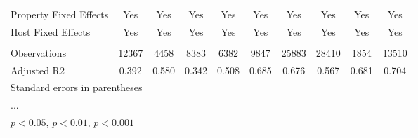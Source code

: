 \begin{table}[htbp]
\begin{tabular}{l*{9}{c}}
Property Fixed Effects&         Yes         &         Yes         &         Yes         &         Yes         &         Yes         &         Yes         &         Yes         &         Yes         &         Yes         \\
Host Fixed Effects  &         Yes         &         Yes         &         Yes         &         Yes         &         Yes         &         Yes         &         Yes         &         Yes         &         Yes         \\
\hline \vspace{-1.25em}&                     &                     &                     &                     &                     &                     &                     &                     &                     \\
Observations        &       12367         &        4458         &        8383         &        6382         &        9847         &       25883         &       28410         &        1854         &       13510         \\
Adjusted R2         &       0.392         &       0.580         &       0.342         &       0.508         &       0.685         &       0.676         &       0.567         &       0.681         &       0.704         \\
\hline\hline
\multicolumn{10}{l}{\footnotesize Standard errors in parentheses}\\
\multicolumn{10}{l}{\footnotesize ...}\\
\multicolumn{10}{l}{\footnotesize \sym{*} \(p<0.05\), \sym{**} \(p<0.01\), \sym{***} \(p<0.001\)}\\
\end{tabular}
\end{table}
